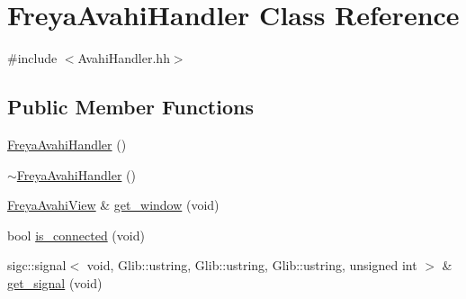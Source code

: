 \hypertarget{classFreyaAvahiHandler}{
\section{\-Freya\-Avahi\-Handler \-Class \-Reference}
\label{classFreyaAvahiHandler}
}


{\ttfamily \#include $<$\-Avahi\-Handler.\-hh$>$}

\subsection*{\-Public \-Member \-Functions}
\begin{DoxyCompactItemize}
\item 
\hyperlink{classFreyaAvahiHandler_a0b45605758a984c038e9af58e68a0c46}{\-Freya\-Avahi\-Handler} ()
\item 
\hyperlink{classFreyaAvahiHandler_a7710b31a1296b2d33d50e91a37824c6a}{$\sim$\-Freya\-Avahi\-Handler} ()
\item 
\hyperlink{classFreyaAvahiView}{\-Freya\-Avahi\-View} \& \hyperlink{classFreyaAvahiHandler_a87d4ba7ea35b5c47e2e8b3cac8edc951}{get\-\_\-window} (void)
\item 
bool \hyperlink{classFreyaAvahiHandler_af4af5eaf8284ea21ee696de722a94737}{is\-\_\-connected} (void)
\item 
sigc\-::signal$<$ void, \*
\-Glib\-::ustring, \-Glib\-::ustring, \*
\-Glib\-::ustring, unsigned int $>$ \& \hyperlink{classFreyaAvahiHandler_a745f63407a58beec3ae7969eb826e106}{get\-\_\-signal} (void)
\end{DoxyCompactItemize}



